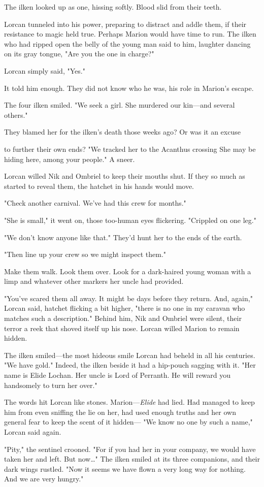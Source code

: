 The ilken looked up as one, hissing softly. Blood slid from their teeth.

Lorcan tunneled into his power, preparing to distract and addle them, if their resistance to magic held true. Perhaps Marion would have time to run. The ilken who had ripped open the belly of the young man said to him, laughter dancing on its gray tongue, "Are you the one in charge?"

Lorcan simply said, "Yes."

It told him enough. They did not know who he was, his role in Marion's escape.

The four ilken smiled. "We seek a girl. She murdered our kin---and several others."

They blamed her for the ilken's death those weeks ago? Or was it an excuse

to further their own ends? "We tracked her to the Acanthus crossing
 She may be hiding here, among your people." A sneer.

Lorcan willed Nik and Ombriel to keep their mouths shut. If they so much as started to reveal them, the hatchet in his hands would move.

"Check another carnival. We've had this crew for months."

"She is small," it went on, those too-human eyes flickering. "Crippled on one leg."

"We don't know anyone like that." They'd hunt her to the ends of the earth.

"Then line up your crew so we might  inspect them."

Make them walk. Look them over. Look for a dark-haired young woman with a limp and whatever other markers her uncle had provided.

"You've scared them all away. It might be days before they return. And, again," Lorcan said, hatchet flicking a bit higher, "there is no one in my caravan who matches such a description." Behind him, Nik and Ombriel were silent, their terror a reek that shoved itself up his nose. Lorcan willed Marion to remain hidden.

The ilken smiled---the most hideous smile Lorcan had beheld in all his centuries. "We have gold." Indeed, the ilken beside it had a hip-pouch sagging with it. "Her name is Elide Lochan. Her uncle is Lord of Perranth. He will reward you handsomely to turn her over."

The words hit Lorcan like stones. Marion---\emph{Elide} had 
lied. Had managed to keep him from even sniffing the lie on her, had used enough truths and her own general fear to keep the scent of it hidden--- "We know no one by such a name," Lorcan said again.

"Pity," the sentinel crooned. "For if you had her in your company, we would have taken her and left. But now\ldots" The ilken smiled at its three companions, and their dark wings rustled. "Now it seems we have flown a very long way for nothing. And we are very hungry."
